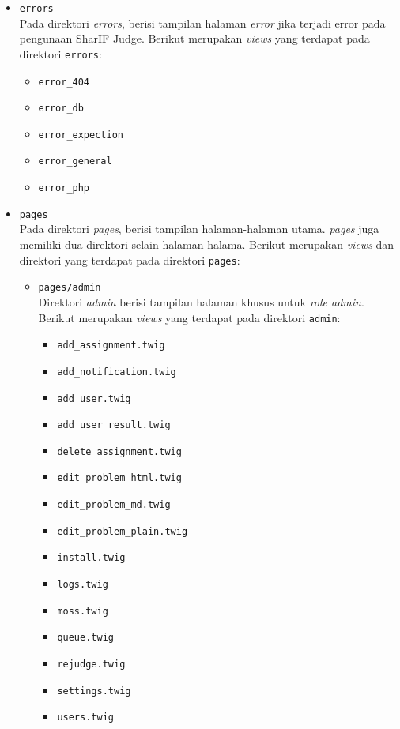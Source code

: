 \begin{itemize}
	\item \verb|errors| \\
	      Pada direktori \textit{errors}, berisi tampilan halaman \textit{error} jika terjadi error pada pengunaan SharIF Judge. Berikut merupakan \textit{views} yang terdapat pada direktori \verb|errors|:

	      \begin{itemize}
		      \item \verb|error_404|
		      \item \verb|error_db|
		      \item \verb|error_expection|
		      \item \verb|error_general|
		      \item \verb|error_php|
	      \end{itemize}

	\item \verb|pages| \\
	      Pada direktori \textit{pages}, berisi tampilan halaman-halaman utama. \textit{pages} juga memiliki dua direktori selain halaman-halama. Berikut merupakan \textit{views} dan direktori yang terdapat pada direktori \verb|pages|:

	      \begin{itemize}
		      \item \verb|pages/admin| \\
		            Direktori \textit{admin} berisi tampilan halaman khusus untuk \textit{role admin}. Berikut merupakan \textit{views} yang terdapat pada direktori \verb|admin|:

		            \begin{itemize}
			            \item \verb|add_assignment.twig|
			            \item \verb|add_notification.twig|
			            \item \verb|add_user.twig|
			            \item \verb|add_user_result.twig|
			            \item \verb|delete_assignment.twig|
			            \item \verb|edit_problem_html.twig|
			            \item \verb|edit_problem_md.twig|
			            \item \verb|edit_problem_plain.twig|
			            \item \verb|install.twig|
			            \item \verb|logs.twig|
			            \item \verb|moss.twig|
			            \item \verb|queue.twig|
			            \item \verb|rejudge.twig|
			            \item \verb|settings.twig|
			            \item \verb|users.twig|
		            \end{itemize}


\end{itemize}
\end{itemize}
